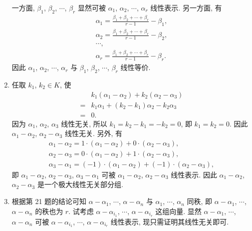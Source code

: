 \begin{enumerate}
        一方面, $\beta_1$, $\beta_2$, $\cdots$, $\beta_r$ 显然可被 $\alpha_1$, $\alpha_2$, $\cdots$, $\alpha_r$ 线性表示. 另一方面, 有
        \begin{gather*}
            \alpha_1 = \frac{\beta_1 + \beta_2 + \cdots + \beta_r}{r - 1} - \beta_1, \\
            \alpha_2 = \frac{\beta_1 + \beta_2 + \cdots + \beta_r}{r - 1} - \beta_2, \\
            \cdots, \\
            \alpha_r = \frac{\beta_1 + \beta_2 + \cdots + \beta_r}{r - 1} - \beta_r.    
        \end{gather*}
        因此 $\alpha_1$, $\alpha_2$, $\cdots$, $\alpha_r$ 与 $\beta_1$, $\beta_2$, $\cdots$, $\beta_r$ 线性等价.
    \item %
        任取 $k_1$, $k_2 \in K$, 使
        \begin{align*}
                & k_1(\alpha_1 - \alpha_2) + k_2(\alpha_2 - \alpha_3) \\
            ={} & k_1\alpha_1 + (k_2 - k_1)\alpha_2 - k_2\alpha_3 \\
            ={} & 0.
        \end{align*}
        因为 $\alpha_1$, $\alpha_2$, $\alpha_3$ 线性无关, 所以 $k_1 = k_2 - k_1 = -k_2 = 0$, 即 $k_1 = k_2 = 0$.
        因此 $\alpha_1 - \alpha_2$, $\alpha_2 - \alpha_3$ 线性无关. 另外, 有
        \begin{gather*}
            \alpha_1 - \alpha_2 = 1 \cdot (\alpha_1 - \alpha_2) + 0 \cdot (\alpha_2 - \alpha_3), \\
            \alpha_2 - \alpha_3 = 0 \cdot (\alpha_1 - \alpha_2) + 1 \cdot (\alpha_2 - \alpha_3), \\
            \alpha_3 - \alpha_1 = (-1) \cdot (\alpha_1 - \alpha_2) + (-1) \cdot (\alpha_2 - \alpha_3),
        \end{gather*}
        即 $\alpha_1 - \alpha_2$, $\alpha_2 - \alpha_3$, $\alpha_3 - \alpha_1$ 可被 $\alpha_1 - \alpha_2$, $\alpha_2 - \alpha_3$ 线性表示.
        因此 $\alpha_1 - \alpha_2$, $\alpha_2 - \alpha_3$ 是一个极大线性无关部分组.
    \item %
        根据第 21 题的结论可知 $\alpha - \alpha_1$, $\cdots$, $\alpha - \alpha_n$ 与 $\alpha_1$, $\cdots$, $\alpha_n$ 同秩, 即 $\alpha - \alpha_1$, $\cdots$, $\alpha - \alpha_n$ 的秩也为 $r$.
        试考虑 $\alpha - \alpha_{i_1}$, $\cdots$, $\alpha - \alpha_{i_r}$ 这组向量. 显然 $\alpha - \alpha_1$, $\cdots$, $\alpha - \alpha_n$ 可被 $\alpha - \alpha_{i_1}$, $\cdots$, $\alpha - \alpha_{i_r}$ 线性表示, 现只需证明其线性无关即可.


\end{enumerate}

